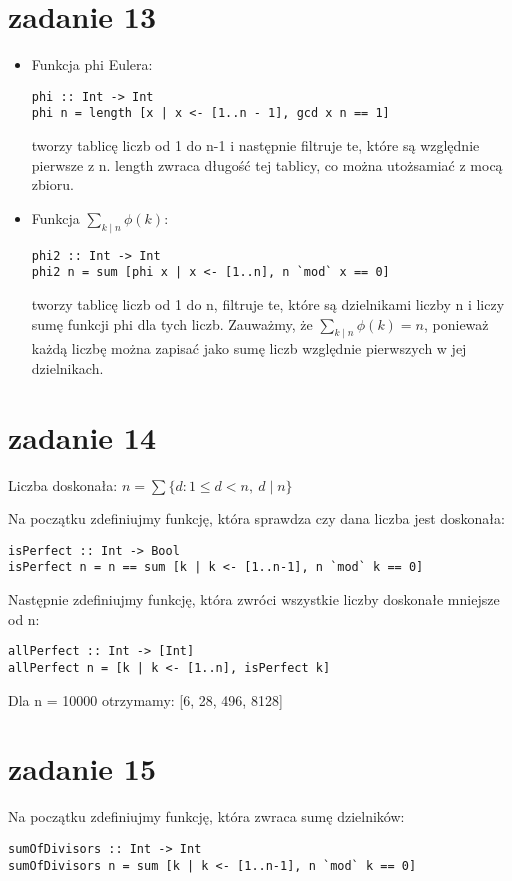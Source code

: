 \documentclass[11pt,a4paper]{article}
\begin{document}
\bigskip

\section*{zadanie 13}
\begin{itemize}
    \item Funkcja phi Eulera:
\begin{verbatim}
phi :: Int -> Int
phi n = length [x | x <- [1..n - 1], gcd x n == 1]
\end{verbatim}
    tworzy tablicę liczb od 1 do n-1 i następnie filtruje te, które są względnie pierwsze z n. length zwraca długość tej tablicy, co można utożsamiać z mocą zbioru.

    \item Funkcja $\sum_{k \mid n} \phi(k)$:
\begin{verbatim}
phi2 :: Int -> Int
phi2 n = sum [phi x | x <- [1..n], n `mod` x == 0]
\end{verbatim}
    tworzy tablicę liczb od 1 do n, filtruje te, które są dzielnikami liczby n i liczy sumę funkcji phi dla tych liczb. Zauważmy, że $\sum_{k \mid n} \phi(k) = n$, ponieważ każdą liczbę można zapisać jako sumę liczb względnie pierwszych w jej dzielnikach.
\end{itemize}

\bigskip

\section*{zadanie 14}
Liczba doskonała: $n = \sum \{d: 1 \leq d < n,\ d\mid n\}$

Na początku zdefiniujmy funkcję, która sprawdza czy dana liczba jest doskonała:
\begin{verbatim}
isPerfect :: Int -> Bool
isPerfect n = n == sum [k | k <- [1..n-1], n `mod` k == 0]
\end{verbatim}

Następnie zdefiniujmy funkcję, która zwróci wszystkie liczby doskonałe mniejsze od n:
\begin{verbatim}
allPerfect :: Int -> [Int]
allPerfect n = [k | k <- [1..n], isPerfect k]
\end{verbatim}

Dla n = 10000 otrzymamy: [6, 28, 496, 8128]

\bigskip

\section*{zadanie 15}
Na początku zdefiniujmy funkcję, która zwraca sumę dzielników:
\begin{verbatim}
sumOfDivisors :: Int -> Int
sumOfDivisors n = sum [k | k <- [1..n-1], n `mod` k == 0]
\end{verbatim}
\end{document}
